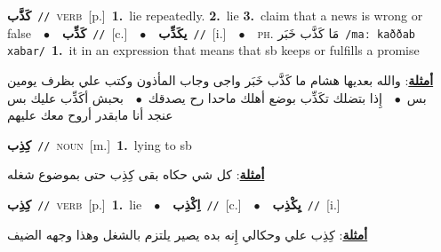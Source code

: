 \documentclass[10pt,a4paper,twoside]{article} %
\begin{document}
\begin{multicols}{2}
{\setlength\topsep{0pt}\textbf{\foreignlanguage{arabic}{كَذَّب}}\ {\color{gray}\texttt{//}\color{black}}\ \textsc{verb}\ [p.]\ \textbf{1.}~lie repeatedly.  \textbf{2.}~lie  \textbf{3.}~claim that a news is wrong or false\ \ $\bullet$\ \ \setlength\topsep{0pt}\textbf{\foreignlanguage{arabic}{كَذِّب}}\ {\color{gray}\texttt{//}\color{black}}\ [c.]\ \ $\bullet$\ \ \setlength\topsep{0pt}\textbf{\foreignlanguage{arabic}{يكَذِّب}}\ {\color{gray}\texttt{//}\color{black}}\ [i.]\ \ $\bullet$\ \ \textsc{ph.} \color{gray} \foreignlanguage{arabic}{مَا كَذَّب خَبَر}\color{black}\ {\color{gray}\texttt{/{\sffamily maː kaððab xabar}/}\color{black}}\ \textbf{1.}~it in an expression that means that sb keeps or fulfills a promise\  \begin{flushright}\color{gray}\foreignlanguage{arabic}{\textbf{\underline{\foreignlanguage{arabic}{أمثلة}}}: والله بعديها هشام ما كَذَّب خَبَر واجى وجاب المأذون وكتب علي بظرف يومين بس\ $\bullet$\ \  إِذا بتضلك تكَذِّب بوضع أهلك ماحدا رح يصدقك\ $\bullet$\ \  بحبش أكَذِّب عليك بس عنجد أنا مابقدر أروح معك عليهم}\end{flushright}\color{black}} \vspace{2mm}

{\setlength\topsep{0pt}\textbf{\foreignlanguage{arabic}{كِذِب}}\ {\color{gray}\texttt{//}\color{black}}\ \textsc{noun}\ [m.]\ \textbf{1.}~lying to sb\  \begin{flushright}\color{gray}\foreignlanguage{arabic}{\textbf{\underline{\foreignlanguage{arabic}{أمثلة}}}: كل شي حكاه بقى كِذِب حتى بموضوع شغله}\end{flushright}\color{black}} \vspace{2mm}

{\setlength\topsep{0pt}\textbf{\foreignlanguage{arabic}{كِذِب}}\ {\color{gray}\texttt{//}\color{black}}\ \textsc{verb}\ [p.]\ \textbf{1.}~lie\ \ $\bullet$\ \ \setlength\topsep{0pt}\textbf{\foreignlanguage{arabic}{اِكْذِب}}\ {\color{gray}\texttt{//}\color{black}}\ [c.]\ \ $\bullet$\ \ \setlength\topsep{0pt}\textbf{\foreignlanguage{arabic}{يِكْذِب}}\ {\color{gray}\texttt{//}\color{black}}\ [i.]\  \begin{flushright}\color{gray}\foreignlanguage{arabic}{\textbf{\underline{\foreignlanguage{arabic}{أمثلة}}}: كِذِب علي وحكالي إِنه بده يصير يلتزم بالشغل وهذا وجهه الضيف}\end{flushright}\color{black}} \vspace{2mm}


\end{multicols}
\end{document}
